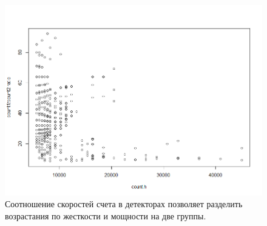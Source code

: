 \begin{figure}
	\centering
	\includegraphics[width=0.7\linewidth]{images/Flash/Rplot11}
	\caption{Соотношение скоростей счета в детекторах позволяет разделить возрастания по жесткости и мощности на две группы.}
	\label{fig:rplot11}
\end{figure}



